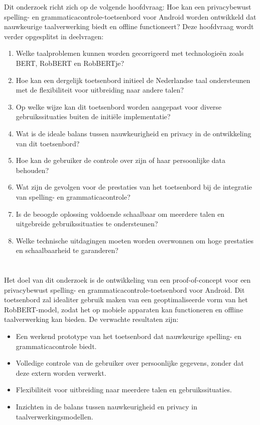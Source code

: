 Dit onderzoek richt zich op de volgende hoofdvraag: Hoe kan een privacybewust spelling- en grammaticacontrole-toetsenbord voor Android worden ontwikkeld dat nauwkeurige taalverwerking biedt en offline functioneert? Deze hoofdvraag wordt verder opgesplitst in deelvragen:
\begin{enumerate}
    \item Welke taalproblemen kunnen worden gecorrigeerd met technologieën zoals BERT, RobBERT en RobBERTje?
    \item Hoe kan een dergelijk toetsenbord initieel de Nederlandse taal ondersteunen met de flexibiliteit voor uitbreiding naar andere talen?
    \item Op welke wijze kan dit toetsenbord worden aangepast voor diverse gebruikssituaties buiten de initiële implementatie?
    \item Wat is de ideale balans tussen nauwkeurigheid en privacy in de ontwikkeling van dit toetsenbord?
    \item Hoe kan de gebruiker de controle over zijn of haar persoonlijke data behouden?
    \item Wat zijn de gevolgen voor de prestaties van het toetsenbord bij de integratie van spelling- en grammaticacontrole?
    \item Is de beoogde oplossing voldoende schaalbaar om meerdere talen en uitgebreide gebruikssituaties te ondersteunen?
    \item Welke technische uitdagingen moeten worden overwonnen om hoge prestaties en schaalbaarheid te garanderen?
\end{enumerate}

\section{}%
\label{sec:onderzoeksdoelstelling}

Het doel van dit onderzoek is de ontwikkeling van een proof-of-concept voor een privacybewust spelling- en grammaticacontrole-toetsenbord voor Android. Dit toe\-tsenbord zal idealiter gebruik maken van een geoptimaliseerde vorm van het Rob\-BERT-model, zodat het op mobiele apparaten kan functioneren en offline taalverwerking kan bieden. De verwachte resultaten zijn:
\begin{itemize}
    \item Een werkend prototype van het toetsenbord dat nauwkeurige spelling- en grammaticacontrole biedt.
    \item Volledige controle van de gebruiker over persoonlijke gegevens, zonder dat deze extern worden verwerkt.
    \item Flexibiliteit voor uitbreiding naar meerdere talen en gebruikssituaties.
    \item Inzichten in de balans tussen nauwkeurigheid en privacy in taalverwerkingsmodellen.
\end{itemize}


